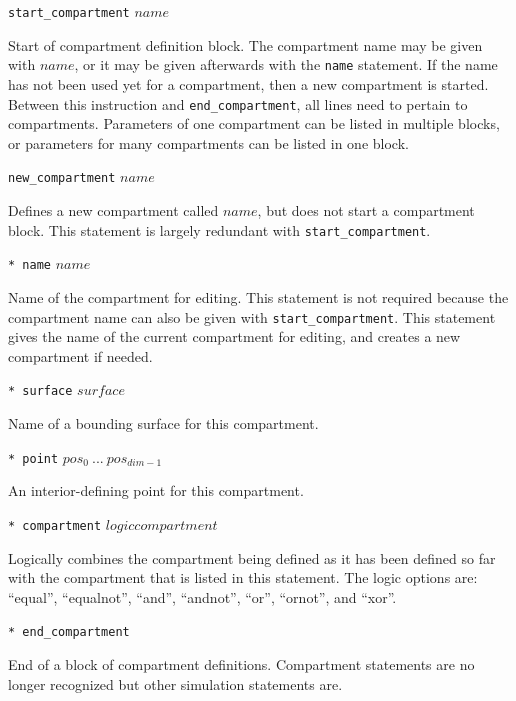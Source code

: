 \documentclass {book}
\newcommand {\ttt} {\texttt}
\begin{document}
\begin{description}

\item{\ttt{start\_compartment} $name$}

Start of compartment definition block. The compartment name may be given with $name$, or it may be given afterwards with the \ttt{name} statement. If the name has not been used yet for a compartment, then a new compartment is started. Between this instruction and \ttt{end\_compartment}, all lines need to pertain to compartments. Parameters of one compartment can be listed in multiple blocks, or parameters for many compartments can be listed in one block.

\item{\ttt{new\_compartment} $name$}

Defines a new compartment called $name$, but does not start a compartment block. This statement is largely redundant with \ttt{start\_compartment}.

\item{\ttt{* name} $name$}

Name of the compartment for editing. This statement is not required because the compartment name can also be given with \ttt{start\_compartment}. This statement gives the name of the current compartment for editing, and creates a new compartment if needed.

\item{\ttt{* surface} $surface$}

Name of a bounding surface for this compartment.

\item{\ttt{* point} $pos_0\ ...\ pos_{dim-1}$}

An interior-defining point for this compartment.

\item{\ttt{* compartment} $logic compartment$}

Logically combines the compartment being defined as it has been defined so far with the compartment that is listed in this statement. The logic options are: ``equal'', ``equalnot'', ``and'', ``andnot'', ``or'', ``ornot'', and ``xor''.

\item{\ttt{* end\_compartment}}

End of a block of compartment definitions. Compartment statements are no longer recognized but other simulation statements are.

\end{description}
\end{document}
